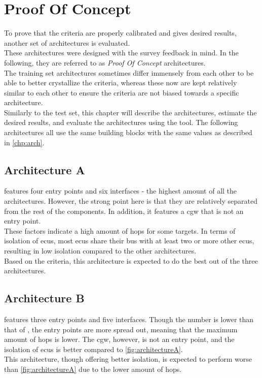 \chapter{Proof Of Concept}
\label{chp:compeval}

To prove that the criteria are properly calibrated and gives desired results, another set of architectures is evaluated.\\
These architectures were designed with the survey feedback in mind.
In the following, they are referred to as \textit{Proof Of Concept} architectures.\\
The training set architectures sometimes differ immensely from each other to be able to better crystallize the criteria,
whereas these now are kept relatively similar to each other to ensure the criteria are not biased towards a specific architecture.\\
Similarly to the test set, this chapter will describe the architectures, estimate the desired results, and evaluate the architectures using the tool.
The following architectures all use the same building blocks with the same values as described in \ref{chp:arch}.

\section{Architecture A}
\label{sec:archa}

 features four entry points and six interfaces - the highest amount of all the architectures.
However, the strong point here is that they are relatively separated from the rest of the components.
In addition, it features a \acrshort{cgw} that is not an entry point.\\
These factors indicate a high amount of hops for some targets.
In terms of isolation of \acrshort{ecu}s, most \acrshort{ecu}s share their bus with at least two or more other \acrshort{ecu}s, resulting in low isolation compared to the other architectures.\\
Based on the criteria, this architecture is expected to do the best out of the three architectures.

\section{Architecture B}
\label{sec:archb}

 features three entry points and five interfaces.
Though the number is lower than that of , the entry points are more spread out, meaning that the maximum amount of hops is lower.
The \acrshort{cgw}, however, is not an entry point, and the isolation of \acrshort{ecu}s is better compared to \ref{fig:architectureA}.\\
This architecture, though offering better isolation, is expected to perform worse than \ref{fig:architectureA} due to the lower amount of hops.
